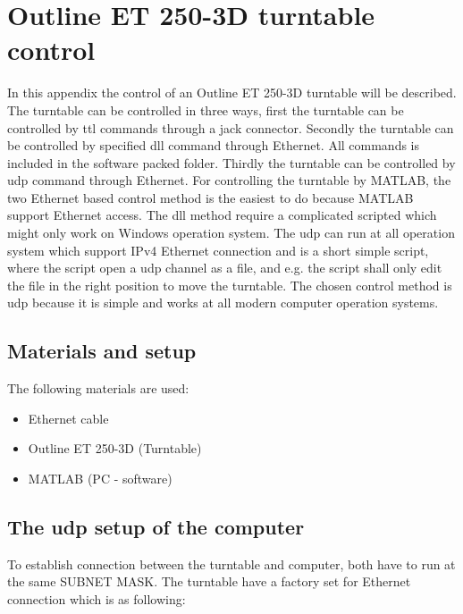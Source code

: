 \chapter*{Outline ET 250-3D turntable control}
In this appendix the control of an Outline ET 250-3D turntable will be described. The turntable can be controlled in three ways, first the turntable can be controlled by \gls{ttl} commands through a jack connector. Secondly the turntable can be controlled by specified \gls{dll} command through Ethernet. All commands is included in the software packed folder. Thirdly the turntable can be controlled by \gls{udp} command through Ethernet. For controlling the turntable by MATLAB, the two Ethernet based control method is the easiest to do because MATLAB support Ethernet access. The \gls{dll} method require a complicated scripted which might only work on Windows operation system. The \gls{udp} can run at all operation system which support IPv4 Ethernet connection and is a short simple script, where the script open a \gls{udp} channel as a file, and e.g.  the script shall only edit the file in the right position to move the turntable. The chosen control method is \gls{udp} because it is simple and works at all modern computer operation systems.

\section*{Materials and setup}
The following materials are used:
\begin{itemize}
\item Ethernet cable
\item Outline ET 250-3D (Turntable)
\item MATLAB (PC - software)
\end{itemize}

%

\section*{The \gls{udp} setup of the computer}
To establish connection between the turntable and computer, both have to run at the same SUBNET MASK. The turntable have a factory set for Ethernet connection which is as following:

